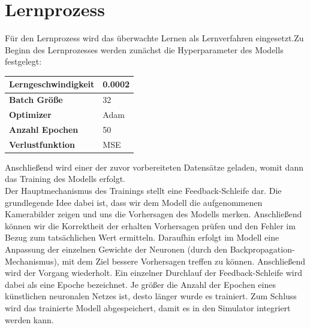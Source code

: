 \section{Lernprozess}

Für den Lernprozess wird das überwachte Lernen als Lernverfahren eingesetzt.Zu Beginn des Lernprozesses werden zunächst die Hyperparameter des Modells festgelegt:
\vspace{-0.4cm}
\begin{center}
	\begin{tabular}[t]{|l|l|}
		\hline
		\textbf{Lerngeschwindigkeit} & 0.0002 \\
		\hline
		\textbf{Batch Größe} & 32 \\
		\hline
		\textbf{Optimizer} & Adam \\
		\hline
		\textbf{Anzahl Epochen} & 50 \\
		\hline
		\textbf{Verlustfunktion} & MSE \\
		\hline
	\end{tabular}
\end{center}

Anschließend wird einer der zuvor vorbereiteten Datensätze geladen, womit dann das Training des Modells erfolgt. \\

Der Hauptmechanismus des Trainings stellt eine Feedback-Schleife dar. Die grundlegende Idee dabei ist, dass wir dem Modell die aufgenommenen Kamerabilder zeigen und uns die Vorhersagen des Modells merken. Anschließend können wir die Korrektheit der erhalten Vorhersagen prüfen und den Fehler im Bezug zum tatsächlichen Wert ermitteln. Daraufhin erfolgt im Modell eine Anpassung der einzelnen Gewichte der Neuronen (durch den Backpropagation-Mechanismus), mit dem Ziel bessere Vorhersagen treffen zu können. Anschließend wird der Vorgang wiederholt. Ein einzelner Durchlauf der  Feedback-Schleife wird dabei als eine Epoche bezeichnet. Je größer die Anzahl der Epochen eines künstlichen neuronalen Netzes ist, desto länger wurde es trainiert. Zum Schluss wird das trainierte Modell abgespeichert, damit es in den Simulator integriert werden kann.

